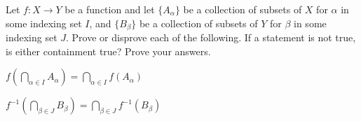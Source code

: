 \begin{comment}
\item We assume that $f$ is an injection and that $A$ is a subset of $Y$. We show that $f^{-1}(f(A)) = A$.  By part (a) we know that $A \subseteq f^{-1}(f(A))$, so we only need to demonstrate that $f^{-1}(f(A)) \subseteq A$. Let $a \in f^{-1}(f(A))$. Then $f(a) \in f(A)$. This implies that there is an element $x \in A$ such that $f(x) = f(a)$. The fact that $f$ is an injection then shows that $a = x \in A$. Thus, $f^{-1}(f(A)) \subseteq A$ and $f^{-1}(f(A)) = A$.

Now assume that $f^{-1}(f(A))= A$ for every subset $A$ of $X$. We will prove that $f$ is an injection. Suppose $x_1$ and $x_2$ are in $X$ with $f(x_1) = f(x_2)$.  Then $x_1 \in f^{-1}(f(\{x_2\})$. By hypothesis, $f^{-1}(f(\{x_2\}) = \{x_2\}$. So $x_1 = x_2$ and $f$ is an injection.

\ea

\end{comment}

\item \label{ex:intersection_image} Let $f : X \to Y$ be a function and let $\{A_{\alpha}\}$ be a collection of subsets of $X$ for $\alpha$ in some indexing set $I$, and $\{B_{\beta}\}$ be a collection of subsets of $Y$ for $\beta$ in some indexing set $J$. Prove or disprove each of the following. If a statement is not true, is either containment true? Prove your answers.
\ba
\item $f\left(\bigcap_{\alpha \in I} A_{\alpha}\right) = \bigcap_{\alpha \in I} f(A_{\alpha})$ 
\item $f^{-1}\left(\bigcap_{\beta \in J} B_{\beta}\right) = \bigcap_{\beta \in J} f^{-1}(B_{\beta})$
\ea

